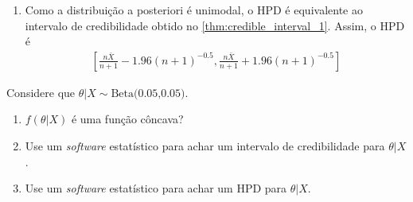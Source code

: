 {\begin{enumerate}[label=(\alph*)]
\begin{itemize}
\item Usando o \cref{thm:credible_interval_2}, 
obtemos um intervalo $[a,b]$ tal que 
$\P(\theta < a|X) = 2.5\%$ e 
$\P(\theta > b|X) = 2.5\%$.
\begin{align*}
\P(\theta < a|X) &= 2.5\% \\
\P\left(\frac{\theta-\E[\theta|X]}
{\sqrt{\V[\theta|X}} 
< \frac{a-\E[\theta|X]}{\sqrt{\V[\theta|X}}|X\right)
&= 2.5\%
\end{align*}
Como $\frac{\theta-\E[\theta|X]}{\sqrt{\V[\theta|X]}}|X \sim N(0,1)$, 
$\frac{a-\E[\theta|X]}{\sqrt{\V[\theta|X}}=-1.96$.
Como a $\theta|X$ é simétrica em torno de
$\E[\theta|X]$, 
$\frac{b-\E[\theta|X]}{\sqrt{\V[\theta|X}}=1.96$.
Assim, obtemos o intervalo
\begin{align*}
\left[\frac{n\bar{X}}{n+1}-1.96(n+1)^{-0.5},
\frac{n\bar{X}}{n+1}+1.96(n+1)^{-0.5}\right]
\end{align*}

\item Usando o \cref{thm:credible_interval_3}, 
obtemos um intervalo $[a,b]$ da forma
\begin{align*}
[a,b]
&= \left[\E[\theta|X]-c\sqrt{\V[\theta|X]},
\E[\theta|X]+c\sqrt{\V[\theta|X]}\right]
\end{align*}
Sabemos pelos itens anteriores que este 
intervalo tem credibilidade $95\%$ somente se 
$c=1.96$. Assim, obtemos o intervalo
\begin{align*}
\left[\frac{n\bar{X}}{n+1}-1.96(n+1)^{-0.5},
\frac{n\bar{X}}{n+1}+1.96(n+1)^{-0.5}\right]
\end{align*}
\end{itemize}

No caso da distribuição normal,
que é unimodal e simétrica em torno de sua média,
todos os intervalos de credibilidade são equivalentes.

\item Como a distribuição a posteriori é unimodal,
o HPD é equivalente ao intervalo de credibilidade 
obtido no \cref{thm:credible_interval_1}.
Assim, o HPD é
\begin{align*}
\left[\frac{n\bar{X}}{n+1}-1.96(n+1)^{-0.5},
\frac{n\bar{X}}{n+1}+1.96(n+1)^{-0.5}\right]
\end{align*}
\end{enumerate}
}{}

\begin{exercise}
Considere que $\theta|X \sim \text{Beta(0.05,0.05)}$.
\begin{enumerate}[label=(\alph*)]
\item $f(\theta|X)$ é uma função côncava?
\item Use um \emph{software} estatístico para 
achar um intervalo de credibilidade para $\theta|X$.
\item Use um \emph{software} estatístico para 
achar um HPD para $\theta|X$.
\end{enumerate}
\end{exercise}

